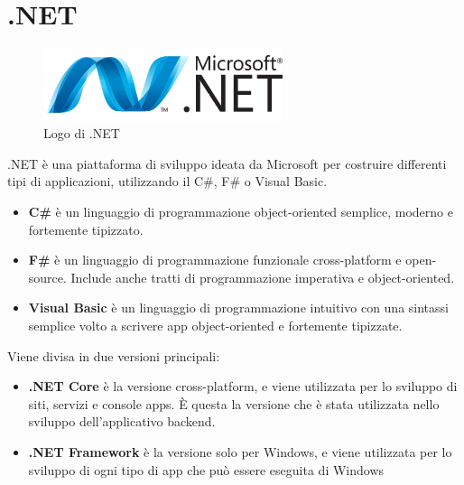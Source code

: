 \section{.NET}
\begin{figure}[h!]
\begin{center}
	\includegraphics[width=7cm]{images/dotnet.png}
	\caption{Logo di .NET}\label{fig:dotnet}
\end{center}
\end{figure}
.NET è una piattaforma di sviluppo ideata da Microsoft per costruire differenti tipi di applicazioni, utilizzando il C\#, F\# o Visual Basic.\cite{DOTNET} 
\begin{itemize}
\item \textbf{C\#} è un linguaggio di programmazione object-oriented semplice, moderno e fortemente tipizzato.
\item \textbf{F\#} è un linguaggio di programmazione funzionale cross-platform e open-source. Include anche tratti di programmazione imperativa e object-oriented.
\item \textbf{Visual Basic} è un linguaggio di programmazione intuitivo con una sintassi semplice volto a scrivere app object-oriented e fortemente tipizzate.
\end{itemize}
Viene divisa in due versioni principali:
\begin{itemize}
\item \textbf{.NET Core} è la versione cross-platform, e viene utilizzata per lo sviluppo di siti, servizi e console apps. È questa la versione che è stata utilizzata nello sviluppo dell'applicativo backend.
\item \textbf{.NET Framework} è la versione solo per Windows, e viene utilizzata per lo sviluppo di ogni tipo di app che può essere eseguita di Windows
\end{itemize}
\pagebreak
